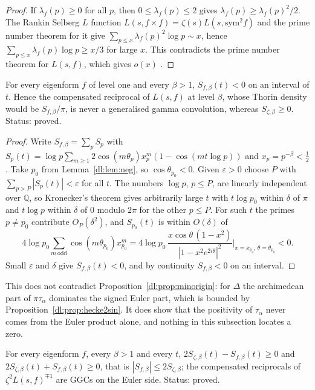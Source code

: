 \begin{proof}
If $\lambda_f(p)\ge0$ for all $p$, then $0\le\lambda_f(p)\le2$ gives $\lambda_f(p)\ge\lambda_f(p)^2/2$. The Rankin Selberg $L$ function $L(s,f\times f)=\zeta(s)L(s,\mathrm{sym}^2f)$ and the prime number theorem for it give $\sum_{p\le x}\lambda_f(p)^2\log p\sim x$, hence $\sum_{p\le x}\lambda_f(p)\log p\ge x/3$ for large $x$. This contradicts the prime number theorem for $L(s,f)$, which gives $o(x)$ \cite[Ch.~5]{IwaniecKowalski04}.
\end{proof}

\begin{theorem}\label{dl:thm:never}
For every eigenform $f$ of level one and every $\beta>1$, $S_{f,\beta}(t)<0$ on an interval of $t$. Hence the compensated reciprocal of $L(s,f)$ at level $\beta$, whose Thorin density would be $S_{f,\beta}/\pi$, is never a generalised gamma convolution, whereas $S_{\zeta,\beta}\ge0$. Status: proved.
\end{theorem}

\begin{proof}
Write $S_{f,\beta}=\sum_pS_p$ with $S_p(t)=\log p\sum_{m\ge1}2\cos(m\theta_p)x_p^m(1-\cos(mt\log p))$ and $x_p=p^{-\beta}<\frac12$. Take $p_0$ from Lemma~\ref{dl:lem:neg}, so $\cos\theta_{p_0}<0$. Given $\varepsilon>0$ choose $P$ with $\sum_{p>P}|S_p(t)|<\varepsilon$ for all $t$. The numbers $\log p$, $p\le P$, are linearly independent over $\mathbb Q$, so Kronecker's theorem gives arbitrarily large $t$ with $t\log p_0$ within $\delta$ of $\pi$ and $t\log p$ within $\delta$ of $0$ modulo $2\pi$ for the other $p\le P$. For such $t$ the primes $p\ne p_0$ contribute $O_P(\delta^2)$, and $S_{p_0}(t)$ is within $O(\delta)$ of
\[
4\log p_0\sum_{m\ \mathrm{odd}}\cos(m\theta_{p_0})x_{p_0}^m=4\log p_0\,\frac{x\cos\theta\,(1-x^2)}{|1-x^2e^{2i\theta}|^2}\Big|_{x=x_{p_0},\,\theta=\theta_{p_0}}<0 .
\]
Small $\varepsilon$ and $\delta$ give $S_{f,\beta}(t)<0$, and by continuity $S_{f,\beta}<0$ on an interval.
\end{proof}

This does not contradict Proposition~\ref{dl:prop:minorigin}: for $\Delta$ the archimedean part of $\pi\tau_\alpha$ dominates the signed Euler part, which is bounded by Proposition~\ref{dl:prop:hecke2sin}. It does show that the positivity of $\tau_\alpha$ never comes from the Euler product alone, and nothing in this subsection locates a zero.

\begin{proposition}\label{dl:prop:hecke2sin}
For every eigenform $f$, every $\beta>1$ and every $t$, $2S_{\zeta,\beta}(t)-S_{f,\beta}(t)\ge0$ and $2S_{\zeta,\beta}(t)+S_{f,\beta}(t)\ge0$, that is $|S_{f,\beta}|\le2S_{\zeta,\beta}$; the compensated reciprocals of $\zeta^2L(s,f)^{\mp1}$ are GGCs on the Euler side. Status: proved.
\end{proposition}


